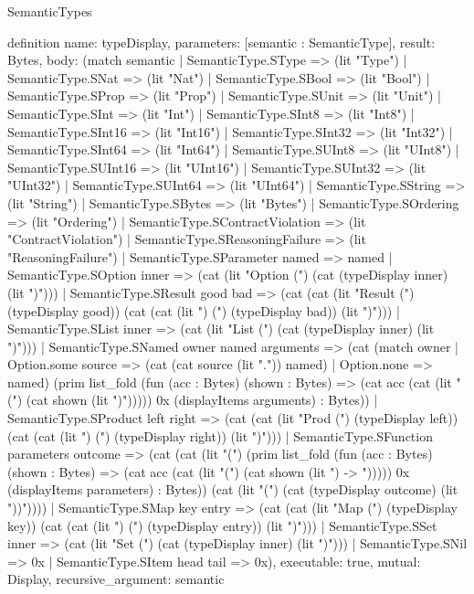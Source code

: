 \begin{lexlean}{SemanticTypes}
\begin{semanticmodule}
definition{
  name: typeDisplay,
  parameters: [semantic : SemanticType],
  result: Bytes,
  body: (match semantic
    | SemanticType.SType => (lit "Type")
    | SemanticType.SNat => (lit "Nat")
    | SemanticType.SBool => (lit "Bool")
    | SemanticType.SProp => (lit "Prop")
    | SemanticType.SUnit => (lit "Unit")
    | SemanticType.SInt => (lit "Int")
    | SemanticType.SInt8 => (lit "Int8")
    | SemanticType.SInt16 => (lit "Int16")
    | SemanticType.SInt32 => (lit "Int32")
    | SemanticType.SInt64 => (lit "Int64")
    | SemanticType.SUInt8 => (lit "UInt8")
    | SemanticType.SUInt16 => (lit "UInt16")
    | SemanticType.SUInt32 => (lit "UInt32")
    | SemanticType.SUInt64 => (lit "UInt64")
    | SemanticType.SString => (lit "String")
    | SemanticType.SBytes => (lit "Bytes")
    | SemanticType.SOrdering => (lit "Ordering")
    | SemanticType.SContractViolation => (lit "ContractViolation")
    | SemanticType.SReasoningFailure => (lit "ReasoningFailure")
    | SemanticType.SParameter named => named
    | SemanticType.SOption inner => (cat (lit "Option (") (cat (typeDisplay inner) (lit ")")))
    | SemanticType.SResult good bad => (cat (cat (lit "Result (") (typeDisplay good)) (cat (cat (lit ") (") (typeDisplay bad)) (lit ")")))
    | SemanticType.SList inner => (cat (lit "List (") (cat (typeDisplay inner) (lit ")")))
    | SemanticType.SNamed owner named arguments => (cat (match owner
      | Option.some source => (cat (cat source (lit ".")) named)
      | Option.none => named) (prim list_fold (fun (acc : Bytes) (shown : Bytes) => (cat acc (cat (lit " (") (cat shown (lit ")"))))) 0x (displayItems arguments) : Bytes))
    | SemanticType.SProduct left right => (cat (cat (lit "Prod (") (typeDisplay left)) (cat (cat (lit ") (") (typeDisplay right)) (lit ")")))
    | SemanticType.SFunction parameters outcome => (cat (cat (lit "(") (prim list_fold (fun (acc : Bytes) (shown : Bytes) => (cat acc (cat (lit "(") (cat shown (lit ") -> "))))) 0x (displayItems parameters) : Bytes)) (cat (lit "(") (cat (typeDisplay outcome) (lit "))"))))
    | SemanticType.SMap key entry => (cat (cat (lit "Map (") (typeDisplay key)) (cat (cat (lit ") (") (typeDisplay entry)) (lit ")")))
    | SemanticType.SSet inner => (cat (lit "Set (") (cat (typeDisplay inner) (lit ")")))
    | SemanticType.SNil => 0x
    | SemanticType.SItem head tail => 0x),
  executable: true,
  mutual: Display,
  recursive_argument: semantic
}


\end{semanticmodule}
\end{lexlean}
